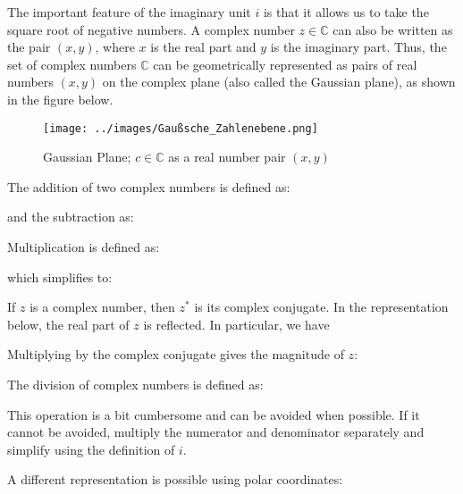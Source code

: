 The important feature of the imaginary unit \( i \) is that it allows us to take the square root of negative numbers. A complex number \( z \in \mathbb{C} \) can also be written as the pair \( (x, y) \), where \( x \) is the real part and \( y \) is the imaginary part. Thus, the set of complex numbers $\mathbb{C}$ can be geometrically represented as pairs of real numbers \( (x, y) \) on the complex plane (also called the Gaussian plane), as shown in the figure below.

\begin{figure}[ht]
    \centering
    \texttt{[image: ../images/Gaußsche\_Zahlenebene.png]}
    \caption{Gaussian Plane; $c \in \mathbb{C}$ as a real number pair $(x, y)$}
    \label{fig:zahlplane}
\end{figure}

The addition of two complex numbers is defined as:


and the subtraction as:


Multiplication is defined as:


which simplifies to:


If \( z \) is a complex number, then \( z^* \) is its complex conjugate. In the representation below, the real part of \( z \) is reflected. In particular, we have 


Multiplying by the complex conjugate gives the magnitude of \( z \):


The division of complex numbers is defined as:


This operation is a bit cumbersome and can be avoided when possible. If it cannot be avoided, multiply the numerator and denominator separately and simplify using the definition of \( i \).

A different representation is possible using polar coordinates:

